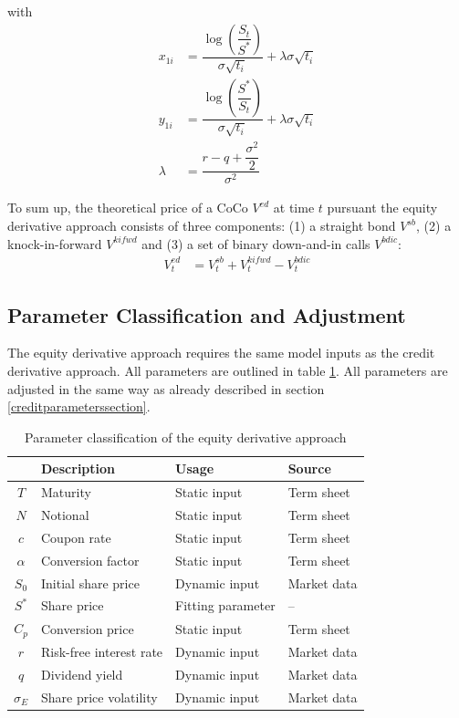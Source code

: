 with 
\begin{align*}
x_{1i} &= \dfrac{\log \left( \dfrac{S_t}{S^*} \right)}{\sigma \sqrt{t_i}} + \lambda \sigma \sqrt{t_i}\\
y_{1i} &= \dfrac{\log \left( \dfrac{S^*}{S_t} \right)}{\sigma \sqrt{t_i}} + \lambda \sigma \sqrt{t_i}\\
\lambda &= \dfrac{r-q+\dfrac{\sigma^2}{2}}{\sigma^2}
\end{align*}

To sum up, the theoretical price of a CoCo $V^{ed}$ at time $t$ pursuant the equity derivative approach consists of three components: (1) a straight bond $V^{sb}$, (2) a knock-in-forward $V^{kifwd}$ and (3) a set of binary down-and-in calls $V^{bdic}$:
\begin{align}
V^{ed}_t &= V^{sb}_t + V_t^{kifwd} - V_{t}^{bdic}
\end{align}

\subsection{Parameter Classification and Adjustment}

The equity derivative approach requires the same model inputs as the credit derivative approach. All parameters  are outlined in table \ref{equityparameters}. All parameters are adjusted in the same way as already described in section \ref{creditparameterssection}.

\begin{table}[H]
	\setlength{\extrarowheight}{2.5pt}
	\centering
	\begin{tabular}{clll}
		\toprule
			 & \textbf{Description} & \textbf{Usage} & \textbf{Source} \\ 
		\midrule
			$T$ & Maturity & Static input & Term sheet \\
			$N$ & Notional & Static input & Term sheet \\			
			$c$ & Coupon rate & Static input & Term sheet \\
			$\alpha$ & Conversion factor & Static input & Term sheet \\
			$S_0$ & Initial share price & Dynamic input & Market data \\
			$S^*$ & Share price & Fitting parameter & -- \\
			$C_p$ & Conversion price & Static input & Term sheet \\
			$r$ & Risk-free interest rate & Dynamic input & Market data \\
			$q$ & Dividend yield & Dynamic input & Market data\\
			$\sigma_E$& Share price volatility & Dynamic input & Market data \\
		\bottomrule
	\end{tabular}
	\caption[Parameter classification of the equity derivative approach]{Parameter classification of the equity derivative approach \citep{wilkens2014contingent}}
	\label{equityparameters}
\end{table}

